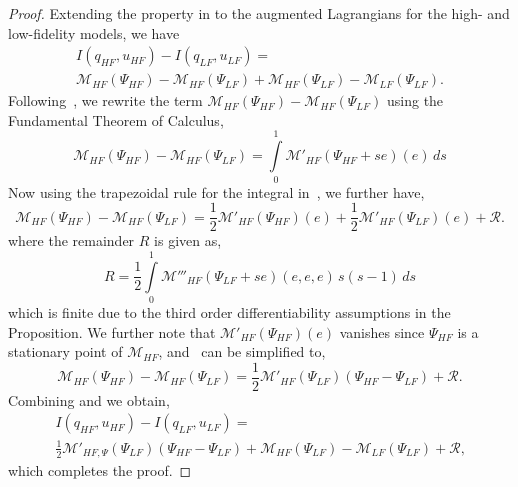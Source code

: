 \begin{proof}
Extending the property in  to the augmented Lagrangians for the high- and low-fidelity models, we have
%
\begin{multline}
\label{eq:repIwithM}
I(q_{HF},u_{HF})-I(q_{LF},u_{LF})=\\\mathcal{M}_{HF}(\Psi_{HF})-\mathcal{M}_{HF}(\Psi_{LF})+\mathcal{M}_{HF}(\Psi_{LF})-\mathcal{M}_{LF}(\Psi_{LF})\textrm{.}
\end{multline}
%
Following~\cite{BecVex05}, we rewrite the term $\mathcal{M}_{HF}(\Psi_{HF})-\mathcal{M}_{HF}(\Psi_{LF})$ using the Fundamental Theorem of Calculus,
%
\begin{equation}
\label{eq:Mantiderivative}
\mathcal{M}_{HF}(\Psi_{HF})-\mathcal{M}_{HF}(\Psi_{LF}) = \int\limits_{0}^{1} \mathcal{M}'_{HF}\left(\Psi_{HF} + se\right)\left(e\right) \, ds
\end{equation}
%
Now using the trapezoidal rule for the integral in~, we further have,
%
\begin{equation}
\label{eq:Mprimetrapezoid}
\mathcal{M}_{HF}(\Psi_{HF})-\mathcal{M}_{HF}(\Psi_{LF}) = \frac{1}{2}\mathcal{M}'_{HF}(\Psi_{HF})(e) + \frac{1}{2}\mathcal{M}'_{HF}(\Psi_{LF})(e) + \mathcal{R}\textrm{.}
\end{equation}
%
where the remainder $R$ is given as,
%
\begin{equation}
\label{eq:trapezoidremainder}
R = \frac{1}{2} \int\limits_{0}^{1} \mathcal{M}'''_{HF}\left(\Psi_{LF} + se\right)(e,e,e) \, s(s-1) \, ds
\end{equation}
%
which is finite due to the third order differentiability assumptions in the Proposition. We further note that $\mathcal{M}'_{HF}(\Psi_{HF})(e)$ vanishes since $\Psi_{HF}$ is a stationary point of $\mathcal{M}_{HF}$, and~ can be simplified to,
%
\begin{equation}
\label{eq:beckvex}
\mathcal{M}_{HF}(\Psi_{HF})-\mathcal{M}_{HF}(\Psi_{LF}) = \frac{1}{2}\mathcal{M}'_{HF}(\Psi_{LF})(\Psi_{HF}-\Psi_{LF})+\mathcal{R}\textrm{.}
\end{equation}
%
Combining  and  we obtain,
%
\begin{multline}
\label{eq:preadj}
I(q_{HF},u_{HF})-I(q_{LF},u_{LF})=\\\frac{1}{2}\mathcal{M}'_{HF,\Psi}(\Psi_{LF})(\Psi_{HF}-\Psi_{LF})+\mathcal{M}_{HF}(\Psi_{LF})-\mathcal{M}_{LF}(\Psi_{LF})+\mathcal{R}\textrm{,}
\end{multline}
which completes the proof.
\end{proof}
%

